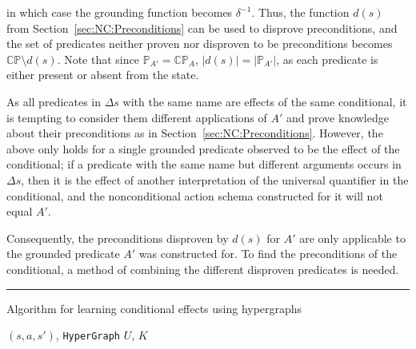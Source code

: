\documentclass[../Master.tex]{subfiles}
\begin{document}
in which case the grounding function becomes $\delta^{-1}$. Thus, the function $d(s)$ from Section~\ref{sec:NC:Preconditions} can be used to disprove preconditions, and the set of predicates neither proven nor disproven to be preconditions becomes $\mathbb{CP} \setminus d(s)$. Note that since $\mathbb{P}_{A'} = \mathbb{CP}_A$, $|d(s)| = |\mathbb{P}_{A'}|$, as each predicate is either present or absent from the state. 

As all predicates in $\Delta s$ with the same name are effects of the same conditional, it is tempting to consider them different applications of $A'$ and prove knowledge about their preconditions as in Section~\ref{sec:NC:Preconditions}. However, the above only holds for a single grounded predicate observed to be the effect of the conditional; if a predicate with the same name but different arguments occurs in $\Delta s$, then it is the effect of another interpretation of the universal quantifier in the conditional, and the nonconditional action schema constructed for it will not equal $A'$.

Consequently, the preconditions disproven by $d(s)$ for $A'$ are only applicable to the grounded predicate $A'$ was constructed for. To find the preconditions of the conditional, a method of combining the different disproven predicates is needed.

\noindent\rule{\textwidth}{1pt}




\begin{algorithm}
    \caption{Algorithm for learning conditional effects using hypergraphs}\label{algo:CondEffLearn}
    \begin{algorithmic}
         {$\left( s, a, s'\right)$, \texttt{HyperGraph} $U$, $K$}
                    
            \EndFor
        \EndFunction%
    \end{algorithmic}
\end{algorithm}
\end{document}
